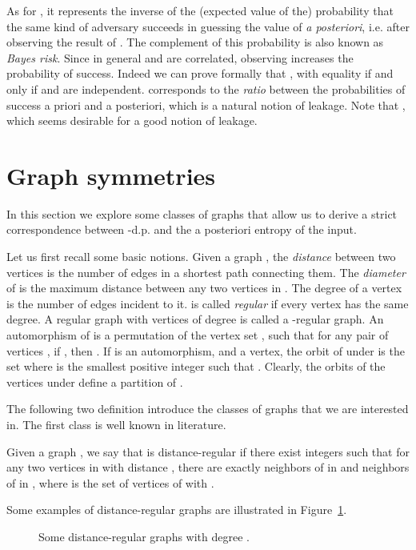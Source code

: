 \documentclass{llncs}
\begin{document}
As for , it represents the inverse of the (expected value of the) probability that the same kind of adversary  succeeds in guessing the value of  \emph{a posteriori}, i.e.  after observing the  result of . The complement of this probability is also known as \emph{Bayes risk}. Since in general  and  are correlated, observing  increases the probability of success. Indeed we can prove formally that , with equality if and only if  and  are independent.  corresponds to the \emph{ratio} between the probabilities of success a priori and a posteriori, which is a natural notion of leakage. Note that , which seems desirable for a good notion of leakage.

\section{Graph symmetries}
In this section we explore some classes of graphs that
allow us to derive a strict correspondence between -d.p. 
and the a posteriori entropy of the input. 

Let us first recall some basic notions. Given a graph ,  the \emph{distance}  between two vertices   is the number of edges in a shortest path connecting them. The \emph{diameter}
of  is the maximum distance between any two vertices in .
The degree of a vertex  is the number of edges incident to it.    is called \emph{regular} if  every vertex has the same degree. A regular graph with vertices of degree   is called a -regular graph.
An automorphism of    is a permutation  of the vertex set , such that for any pair of vertices , if , then . If  is an automorphism, and  a vertex, the orbit of  under  is the set  where  is the smallest positive integer such that . Clearly, the orbits of the vertices under  define a partition of .

The following two definition introduce the classes of graphs that we are interested in. The first class is well known in literature. 
\begin{definition}
Given a graph , we say that  is   distance-regular if there exist integers  such that for any two vertices  in   with distance , there are exactly  neighbors of  in   and  neighbors of  in , where  is the set of vertices  of  with . 
\end{definition}

Some examples of distance-regular graphs are illustrated in Figure~\ref{fig:dist-reg}.

	\begin{figure}[t]\centering
		\qquad
		\qquad
		\caption{Some distance-regular graphs with degree .}
		\label{fig:dist-reg}	
	\end{figure}
	
\end{document}
